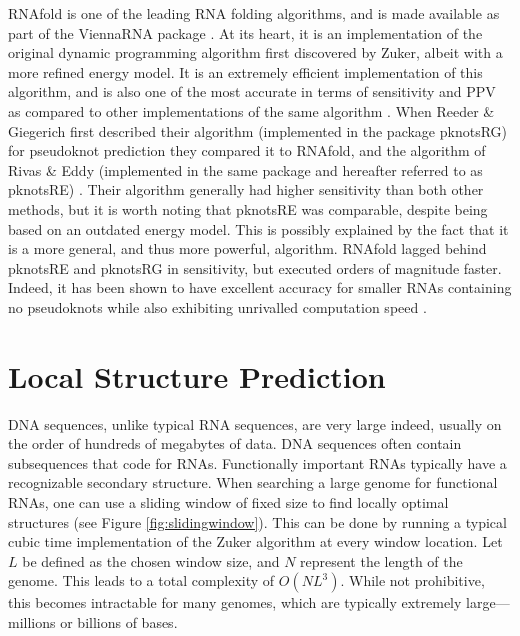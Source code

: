 \documentclass{cshonours}
\begin{document}
RNAfold \cite{lorenz2011viennarna} is one of the leading RNA folding algorithms, and is made available
as part of the ViennaRNA package \cite{lorenz2011viennarna}. At its heart, it is an implementation
of the original dynamic programming algorithm first discovered by Zuker, albeit
with a more refined energy model. It is an extremely efficient implementation of
this algorithm, and is also one of the most accurate in terms of sensitivity and
PPV as compared to other implementations of the same algorithm \cite{lorenz2011viennarna}. When
Reeder \& Giegerich \cite{reeder2004design} first described their algorithm (implemented in the package pknotsRG) for pseudoknot prediction they compared it to RNAfold, and the
algorithm of Rivas \& Eddy (implemented in the same package and hereafter
referred to as pknotsRE) \cite{rivas1999dynamic}. Their algorithm generally had higher sensitivity than
both other methods, but it is worth noting that pknotsRE was comparable, despite being based on an outdated energy model. This is possibly explained by
the fact that it is a more general, and thus more powerful, algorithm. RNAfold
lagged behind pknotsRE and pknotsRG in sensitivity, but executed orders of magnitude faster. Indeed, it has been shown to have excellent accuracy for smaller RNAs containing
no pseudoknots while also exhibiting unrivalled computation speed \cite{lorenz2011viennarna}.


\section{Local Structure Prediction}
\label{sec:locopt}


DNA sequences, unlike typical RNA sequences, are very large indeed, usually
on the order of hundreds of megabytes of data. DNA sequences often contain subsequences that code for RNAs. Functionally important RNAs typically have
a recognizable secondary structure. When searching a large genome for functional RNAs, one can use a sliding window of fixed size to find locally optimal
structures (see Figure \ref{fig:slidingwindow}). This can be done by running a typical cubic time implementation of the Zuker algorithm at every window location. Let $L$ be defined as the chosen
window size, and $N$ represent the length of the genome. This leads to a total complexity of $O(NL^3)$. While not prohibitive, this becomes intractable for many
genomes, which are typically extremely large---millions or billions of bases. 
\end{document}
